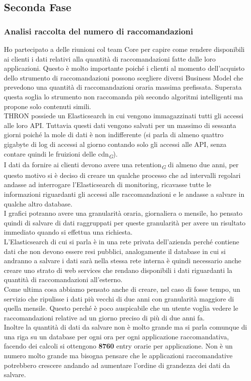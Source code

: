 \documentclass[a4paper, 12pt, twoside, openright]{book}
\newcommand{\gloss}[1]{#1\textsubscript{\textit{\tiny{G}}}}
\begin{document}
\subsection{Seconda Fase}

\subsubsection{Analisi raccolta del numero di raccomandazioni}
Ho partecipato a delle riunioni col team Core per capire come rendere disponibili ai clienti i dati relativi alla quantità di raccomandazioni fatte dalle loro applicazioni. Questo è molto importante poiché i clienti al momento dell'acquisto dello strumento di raccomandazioni possono scegliere diversi Business Model che prevedono una quantità di raccomandazioni oraria massima prefissata. Superata questa soglia lo strumento non raccomanda più secondo algoritmi intelligenti ma propone solo contenuti simili.\\
THRON possiede un Elasticsearch in cui vengono immagazzinati tutti gli accessi alle loro API. Tuttavia questi dati vengono salvati per un massimo di sessanta giorni poiché la mole di dati è non indifferente (si parla di almeno quattro gigabyte di log di accessi al giorno contando solo gli accessi alle API, senza contare quindi le fruizioni delle \gloss{cdn}).\\
I dati da fornire ai clienti devono avere una \gloss{retention} di almeno due anni, per questo motivo si è deciso di creare un qualche processo che ad intervalli regolari andasse ad interrogare l'Elasticsearch di monitoring, ricavasse tutte le informazioni riguardanti gli accessi alle raccomandazioni e le andasse a salvare in qualche altro database.\\
I grafici potranno avere una granularità oraria, giornaliera o mensile, ho pensato quindi di salvare di dati raggruppati per queste granularità per avere un risultato immediato quando si effettua una richiesta.\\
L'Elasticsearch di cui si parla è in una rete privata dell'azienda perché contiene dati che non devono essere resi pubblici, analogamente il database in cui si andranno a salvare i dati sarà nella stessa rete interna è quindi necessario anche creare uno strato di web services che rendano disponibili i dati riguardanti la quantità di raccomandazioni all'esterno.\\
Come ultima cosa abbiamo pensato anche di creare, nel caso di fosse tempo, un servizio che ripulisse i dati più vecchi di due anni con granularità maggiore di quella mensile. Questo perché è poco auspicabile che un utente voglia vedere le raccomandazioni relative ad un giorno preciso di più di due anni fa.\\
Inoltre la quantità di dati da salvare non è molto grande ma si parla comunque di una riga su un database per ogni ora per ogni applicazione raccomandativa, facendo dei calcoli si ottengono \textbf{8760} entry orarie per applicazione. Non è un numero molto grande ma bisogna pensare che le applicazioni raccomandative potrebbero crescere andando ad aumentare l'ordine di grandezza dei dati da salvare.\\
\end{document}
